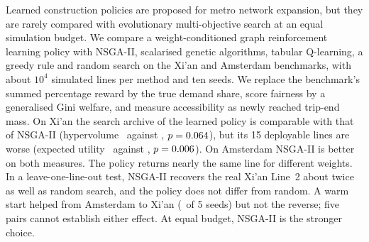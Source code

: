 Learned construction policies are proposed for metro network expansion, but they are rarely compared with evolutionary multi-objective search at an equal simulation budget. We compare a weight-conditioned graph reinforcement learning policy with NSGA-II, scalarised genetic algorithms, tabular Q-learning, a greedy rule and random search on the Xi'an and Amsterdam benchmarks, with about $10^4$ simulated lines per method and ten seeds. We replace the benchmark's summed percentage reward by the true demand share, score fairness by a generalised Gini welfare, and measure accessibility as newly reached trip-end mass. On Xi'an the search archive of the learned policy is comparable with that of NSGA-II (hypervolume \XianRLArchHv\ against \XianNSGAArchHv, $p=0.064$), but its 15 deployable lines are worse (expected utility \XianRLEum\ against \XianNSGAEum, $p=0.006$). On Amsterdam NSGA-II is better on both measures. The policy returns nearly the same line for different weights. In a leave-one-line-out test, NSGA-II recovers the real Xi'an Line~2 about twice as well as random search, and the policy does not differ from random. A warm start helped from Amsterdam to Xi'an (\TrAmsXianFullWins\ of 5 seeds) but not the reverse; five pairs cannot establish either effect. At equal budget, NSGA-II is the stronger choice.
